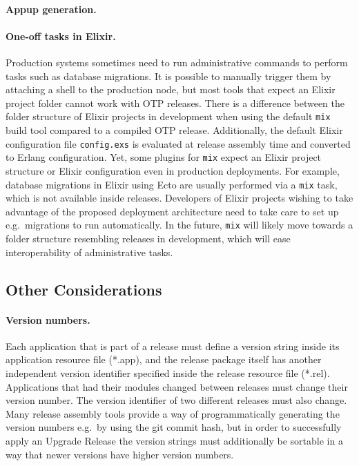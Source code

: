\paragraph{Appup generation.}
%

\paragraph{One-off tasks in Elixir.}
Production systems sometimes need to run administrative commands to perform tasks such as database migrations. It is possible to manually trigger them by attaching a shell to the production node, but most tools that expect an Elixir project folder cannot work with OTP releases. There is a difference between the folder structure of Elixir projects in development when using the default \lstinline|mix| build tool compared to a compiled OTP release. Additionally, the default Elixir configuration file \lstinline|config.exs| is evaluated at release assembly time and converted to Erlang configuration. Yet, some plugins for \lstinline|mix| expect an Elixir project structure or Elixir configuration even in production deployments. For example, database migrations in Elixir using Ecto are usually performed via a \lstinline|mix| task, which is not available inside releases. Developers of Elixir projects wishing to take advantage of the proposed deployment architecture need to take care to set up e.g.~migrations to run automatically. In the future, \lstinline|mix| will likely move towards a folder structure resembling releases in development, which will ease interoperability of administrative tasks.~\cite{mix_releases}



\subsection{Other Considerations}

\paragraph{Version numbers.}
Each application that is part of a release must define a version string inside its application resource file (*.app), and the release package itself has another independent version identifier specified inside the release resource file (*.rel). Applications that had their modules changed between releases must change their version number. The version identifier of two different releases must also change. Many release assembly tools provide a way of programmatically generating the version numbers e.g.~by using the git commit hash, but in order to successfully apply an Upgrade Release the version strings must additionally be sortable in a way that newer versions have higher version numbers.


